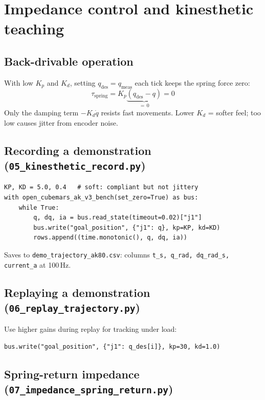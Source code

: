 \documentclass[11pt,a4paper]{article}
\begin{document}
\section{Impedance control and kinesthetic teaching}
\label{sec:impedance}

\subsection{Back-drivable operation}

With low $K_p$ and $K_d$, setting $q_{\text{des}} = q_{\text{meas}}$
each tick keeps the spring force zero:
\[
  \tau_{\text{spring}} = K_p\underbrace{(q_{\text{des}} - q)}_{=\,0} = 0
\]
Only the damping term $-K_d\dot{q}$ resists fast movements.
Lower $K_d$ = softer feel; too low causes jitter from encoder noise.

\subsection{Recording a demonstration (\texttt{05\_kinesthetic\_record.py})}

\begin{lstlisting}
KP, KD = 5.0, 0.4   # soft: compliant but not jittery
with open_cubemars_ak_v3_bench(set_zero=True) as bus:
    while True:
        q, dq, ia = bus.read_state(timeout=0.02)["j1"]
        bus.write("goal_position", {"j1": q}, kp=KP, kd=KD)
        rows.append((time.monotonic(), q, dq, ia))
\end{lstlisting}

Saves to \texttt{demo\_trajectory\_ak80.csv}:
columns \texttt{t\_s, q\_rad, dq\_rad\_s, current\_a} at 100\,Hz.

\subsection{Replaying a demonstration (\texttt{06\_replay\_trajectory.py})}

Use higher gains during replay for tracking under load:
\begin{lstlisting}
bus.write("goal_position", {"j1": q_des[i]}, kp=30, kd=1.0)
\end{lstlisting}

\subsection{Spring-return impedance (\texttt{07\_impedance\_spring\_return.py})}
\end{document}
